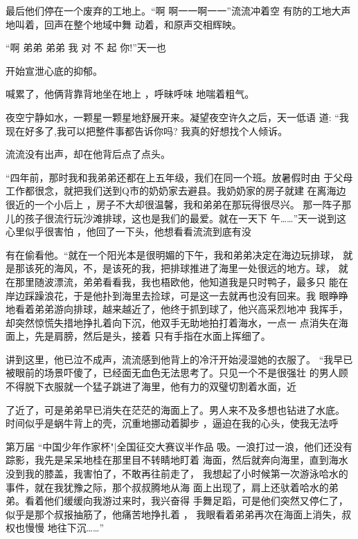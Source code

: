 \documentclass{article}
\begin{document}
最后他们停在一个废弃的工地上。“啊  啊一一啊一一”流流冲着空
有防的工地大声地叫着，回声在整个地域中舞
动着，和原声交相辉映。 

“啊  弟弟  弟弟  我  对  不  起  你!”天一也
\newpage


开始宣泄心底的抑郁。 

喊累了，他俩背靠背地坐在地上 ，呼昧呼味
地喘着粗气。 

夜空宁静如水，一颗星一颗星地舒展开来。凝望夜空许久之后，天一低语
道: “我现在好多了,我可以把整件事都告诉你吗? 我真的好想找个人倾诉。

流流没有出声，却在他背后点了点头。 

“四年前，那时我和我弟弟还都在上五年级，我们在同一个班。放暑假时由
于父母工作都很念，就把我们送到Q市的奶奶家去避县。我奶奶家的房子就建
在离海边很近的一个小后上 ，房子不大却很温馨，我和弟弟在那玩得很尽兴。
那一阵子那儿的孩子很流行玩沙滩排球，这也是我们的最爱。就在一天下
午……”天一说到这心里似乎很害怕 ，他回了一下头，他想看看流流到底有没
\newpage

有在偷看他。“就在一个阳光本是很明媚的下午，我和弟弟决定在海边玩排球，
就是那该死的海风，不，是该死的我，把排球推进了海里一处很远的地方。球，
就在那里随波漂流，弟弟看看我，我也梧欧他，他知道我是只时鸭子，最多只
能在岸边踩躁浪花，于是他扑到海里去捡球，可是这一去就再也没有回来。我
眼睁睁地看着弟弟游向排球，越来越近了，他终于抓到球了，他兴高采烈地冲
我挥手，却突然惊慌失措地挣扎着向下沉，他双手无助地拍打着海水，一点一
点消失在海面上，先是肩膀，然后是头，接着
只有手指在水面上挥细了。 

讲到这里，他已泣不成声，流流感到他背上的冷汗开始浸湿她的衣服了。
“我早已被眼前的场景吓傻了，已经面无血色无法思考了。只见一个不是很强壮
的男人顾不得脱下衣服就一个猛子跳进了海里，他有力的双璧切割着水面，近
\newpage

了近了，可是弟弟早已消失在茫茫的海面上了。男人来不及多想也钻进了水底。
时间似乎是蜗牛背上的壳，沉重地挪动着脚步
，逼迫在我的心头，使我无法呼 


第万届 “中国少年作家杯"|全国征交大赛议半作品
吸。一浪打过一浪，他们还没有踪影，我先是呆呆地桂在那里目不转睛地盯着
海面，然后就奔向海里，直到海水没到我的膝盖，我害怕了，不敢再往前走了，
我想起了小时候第一次游泳哈水的事件，就在我犹豫之际，那个叔叔腾地从海
面上出现了，肩上还驮着哈水的弟弟。看着他们缓缓向我游过来时，我兴奋得
手舞足蹈，可是他们突然又停仁了，似乎是那个叔报抽筋了，他痛苦地挣扎着 ，
我眼看着弟弟再次在海面上消失，叔权也慢慢
地往下沉……” 

\newpage
\end{document}
